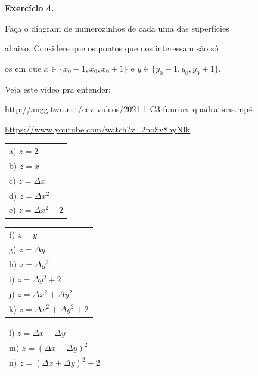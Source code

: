 \documentclass[oneside,12pt]{article}
\begin{document}
\newpage




{\bf Exercício 4.}

Faça o diagram de numerozinhos de cada uma das superfícies

abaixo. Considere que os pontos que nos interessam são só

os em que $x∈\{x_0-1, x_0, x_0+1\}$ e $y∈\{y_0-1, y_0, y_0+1\}$.

Veja este vídeo pra entender:

\ssk

{\scriptsize


\url{http://angg.twu.net/eev-videos/2021-1-C3-funcoes-quadraticas.mp4}

\url{https://www.youtube.com/watch?v=2noSv8hyNIk}

}

\msk

\begin{tabular}[t]{l}
a) $z = 2$ \\
b) $z = x$ \\
c) $z = Δx$ \\
d) $z = Δx^2$ \\
e) $z = Δx^2 + 2$ \\
\end{tabular}
\msk
\begin{tabular}[t]{l}
f) $z = y$ \\
g) $z = Δy$ \\
h) $z = Δy^2$ \\
i) $z = Δy^2 + 2$ \\
j) $z = Δx^2+Δy^2$ \\
k) $z = Δx^2+Δy^2 + 2$ \\
\end{tabular}
\msk
\begin{tabular}[t]{l}
l) $z = Δx+Δy$ \\
m) $z = (Δx+Δy)^2$ \\
n) $z = (Δx+Δy)^2 + 2$ \\
\end{tabular}

\newpage

\end{document}
